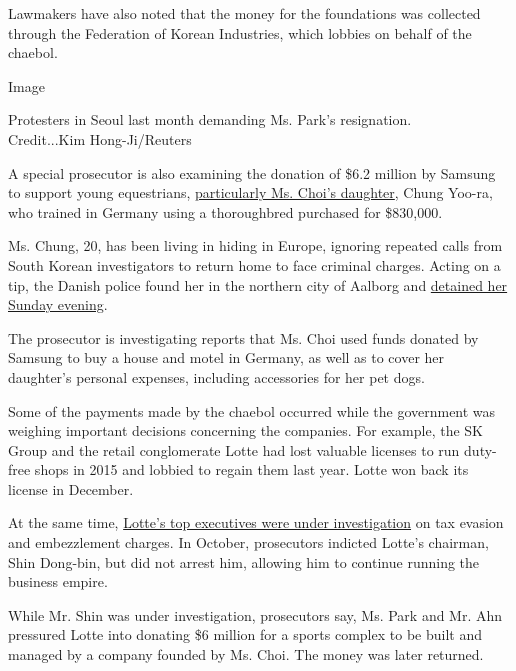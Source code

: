Lawmakers have also noted that the money for the foundations was
collected through the Federation of Korean Industries, which lobbies on
behalf of the chaebol.

Image

Protesters in Seoul last month demanding Ms. Park's
resignation.\href{http://www.nytimes3xbfgragh.onion/2016/12/10/world/asia/south-korea-protests-history.html}{\\
}Credit...Kim Hong-Ji/Reuters

A special prosecutor is also examining the donation of \$6.2 million by
Samsung to support young equestrians,
\href{http://www.reuters.com/article/us-southkorea-politics-samsung-equestria-idUSKBN14J0T0}{particularly
Ms. Choi's daughter}, Chung Yoo-ra, who trained in Germany using a
thoroughbred purchased for \$830,000.

Ms. Chung, 20, has been living in hiding in Europe, ignoring repeated
calls from South Korean investigators to return home to face criminal
charges. Acting on a tip, the Danish police found her in the northern
city of Aalborg and
\href{https://www.nytimes3xbfgragh.onion/2017/01/02/world/asia/south-korea-scandal-choi-soon-sil-daughter.html}{detained
her Sunday evening}.

The prosecutor is investigating reports that Ms. Choi used funds donated
by Samsung to buy a house and motel in Germany, as well as to cover her
daughter's personal expenses, including accessories for her pet dogs.

Some of the payments made by the chaebol occurred while the government
was weighing important decisions concerning the companies. For example,
the SK Group and the retail conglomerate Lotte had lost valuable
licenses to run duty-free shops in 2015 and lobbied to regain them last
year. Lotte won back its license in December.

At the same time,
\href{https://www.nytimes3xbfgragh.onion/2016/10/20/business/international/south-korea-lotte-chaebol-conglomerate-indicted.html}{Lotte's
top executives were under investigation} on tax evasion and embezzlement
charges. In October, prosecutors indicted Lotte's chairman, Shin
Dong-bin, but did not arrest him, allowing him to continue running the
business empire.

While Mr. Shin was under investigation, prosecutors say, Ms. Park and
Mr. Ahn pressured Lotte into donating \$6 million for a sports complex
to be built and managed by a company founded by Ms. Choi. The money was
later returned.

